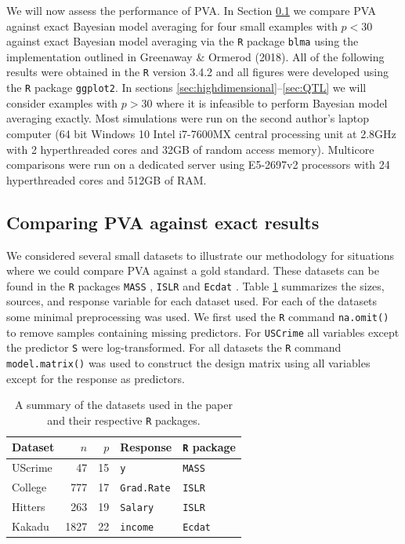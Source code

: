 We will now assess the performance of PVA. In Section \ref{sec:exact} we compare PVA 
against exact
Bayesian model averaging for four small examples with $p<30$ against exact Bayesian
model averaging via the {\tt R} package {\tt blma} using the implementation outlined 
in Greenaway \& Ormerod (2018). All of the following results were obtained in the 
{\tt R} version 3.4.2 \citep{CiteR} and all figures were developed using the {\tt R} 
package {\tt ggplot2}.
In sections \ref{sec:highdimensional}--\ref{sec:QTL}
we will consider examples with $p>30$ where
it is infeasible to perform Bayesian model averaging exactly. 
Most simulations were run on the second author's laptop computer (64 bit Windows 10 Intel
i7-7600MX central processing unit at 2.8GHz with 2 hyperthreaded cores and 32GB of random access memory). 
Multicore comparisons were run on a dedicated server using E5-2697v2 processors
with 24 hyperthreaded cores and 512GB of RAM.

\subsection{Comparing PVA against exact results} 
\label{sec:exact}

We considered several small datasets to illustrate our methodology for situations where
we could compare PVA against a gold standard. These datasets
can be found in the {\tt R} packages {\tt MASS} \citep{Venables2002},  {\tt ISLR} \cite{James:2014:ISL:2517747}
and {\tt Ecdat} \citep{Croissant2016}. Table \ref{tab:cva_datasets} summarizes the sizes,  
sources, and response variable for each dataset used.   For each of the datasets some minimal preprocessing was used.
We first used the {\tt R} command {\tt na.omit()} to remove samples containing missing predictors. 
For {\tt USCrime} all variables except the predictor {\tt S} were log-transformed. For all datasets
the {\tt R} command {\tt model.matrix()} was used to construct the design matrix using all 
variables except for the response as predictors.

\begin{table}[ht!]
	\begin{center}
		\begin{tabular}{l|r|r|l|l}
			Dataset	& $n$ & $p$ & Response & {\tt R} package \\ 
			\hline 
			UScrime 	& 47 & 15 &  {\tt y} & {\tt MASS} \\  
			College &  777   & 17      &  {\tt Grad.Rate}      & {\tt ISLR} \\ 
			Hitters	& 263 & 19 & {\tt Salary} & {\tt ISLR} \\ 
			Kakadu	& 1827 & 22 & {\tt income} & {\tt Ecdat}   \\  
		\end{tabular} 
	\end{center}
	\caption{A summary of the datasets used in the paper and their respective {\tt R} packages.}
	\label{tab:cva_datasets}
\end{table}

